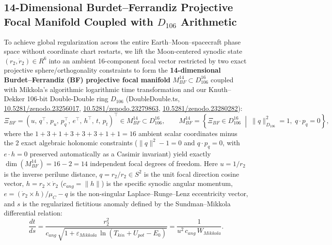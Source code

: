 \documentclass[11pt,a4paper,reqno]{article}
\def\bm#1{#1}%
\def\texttt#1{#1}%
\def\mathrm#1{#1}%
\def\mathcal#1{#1}%
\def\mathbb#1{#1}%
\newcommand{\zenodo}[1]{\href{https://doi.org/10.5281/zenodo.#1}{\texttt{10.5281/\allowbreak zenodo.#1}}}
\theoremstyle{plain}
\theoremstyle{definition}
\theoremstyle{remark}
\numberwithin{equation}{section}
\begin{document}
\subsection{14-Dimensional Burdet--Ferrandiz Projective Focal Manifold Coupled with \texorpdfstring{$\mathbb{D}_{106}$}{D106} Arithmetic}
To achieve global regularization across the entire Earth--Moon--spacecraft phase space without coordinate chart restarts, we lift the Moon-centered synodic state $(\bm{r}_2, \dot{\bm{r}}_2) \in \mathbb{R}^6$ into an ambient 16-component focal vector restricted by two exact projective sphere/orthogonality constraints to form the \textbf{14-dimensional Burdet--Ferrandiz (BF) projective focal manifold} $\mathcal{M}_{\mathrm{BF}}^{14} \subset \mathbb{D}_{106}^{16}$ \cite{Burdet1969, Ferrandiz1988} coupled with Mikkola's algorithmic logarithmic time transformation \cite{MikkolaTanikawa1999} and our Knuth--Dekker 106-bit Double-Double ring $\mathbb{D}_{106}$ (\texttt{DoubleDouble.ts}, \zenodo{23256017}, \zenodo{23279863}, \zenodo{23280282}):
\begin{equation}
  \bm{\Xi}_{\mathrm{BF}} = \left( u,\, \bm{q}^\top,\, p_u,\, \bm{p}_q^\top,\, \bm{e}^\top,\, \bm{h}^\top,\, t,\, p_t \right)^\top \in \mathcal{M}_{\mathrm{BF}}^{14} \subset \mathbb{D}_{106}^{16}, \qquad \mathcal{M}_{\mathrm{BF}}^{14} = \left\{ \bm{\Xi}_{\mathrm{BF}} \in \mathbb{D}_{106}^{16} \;\middle|\; \|\bm{q}\|_{\mathbb{D}_{106}}^2 = 1,\; \bm{q} \cdot \bm{p}_q = 0 \right\},
  \label{eq:bf_14d_state}
\end{equation}
where the $1 + 3 + 1 + 3 + 3 + 3 + 1 + 1 = 16$ ambient scalar coordinates minus the $2$ exact algebraic holonomic constraints ($\|\bm{q}\|^2 - 1 = 0$ and $\bm{q}\cdot\bm{p}_q = 0$, with $\bm{e} \cdot \bm{h} = 0$ preserved automatically as a Casimir invariant) yield exactly $\dim(\mathcal{M}_{\mathrm{BF}}^{14}) = 16 - 2 = 14$ independent focal degrees of freedom. Here $u = 1/r_2$ is the inverse perilune distance, $\bm{q} = \bm{r}_2 / r_2 \in S^2$ is the unit focal direction cosine vector, $\bm{h} = \bm{r}_2 \times \dot{\bm{r}}_2$ ($c_{\mathrm{ang}} = \|\bm{h}\|$) is the specific synodic angular momentum, $\bm{e} = (\dot{\bm{r}}_2 \times \bm{h})/\mu_{\mathbb{C}} - \bm{q}$ is the non-singular Laplace--Runge--Lenz eccentricity vector, and $s$ is the regularized fictitious anomaly defined by the Sundman--Mikkola differential relation:
\begin{equation}
  \frac{\mathrm{d}t}{\mathrm{d}s} = \frac{r_2^2}{c_{\mathrm{ang}}\,\sqrt{1 + \varepsilon_{\mathrm{Mikkola}}\,\ln(T_{\mathrm{kin}} + U_{\mathrm{pot}} - E_0)}} = \frac{1}{u^2\,c_{\mathrm{ang}}\,\mathcal{W}_{\mathrm{Mikkola}}}.
  \label{eq:bf_sundman_mikkola}
\end{equation}
\end{document}
